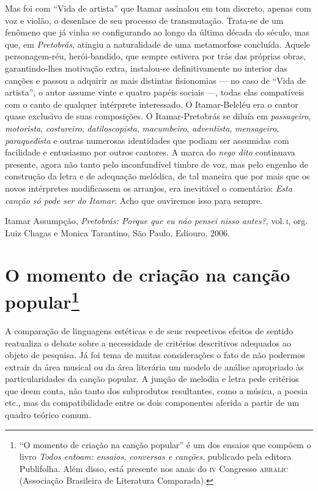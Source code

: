 Mas foi com ``Vida de artista'' que Itamar assinalou em tom discreto, apenas
com voz e violão, o desenlace de seu processo de transmutação. Trata-se
de um fenômeno que já vinha se configurando ao longo da última década do
século, mas que, em \textit{Pretobrás}, atingiu a naturalidade de uma metamorfose
concluída. Aquele personagem-réu, herói-bandido, que sempre estivera por
trás das próprias obras, garantindo-lhes motivação extra, instalou-se
definitivamente no interior das canções e passou a adquirir as mais
distintas fisionomias --- no caso de ``Vida de artista'', o autor assume vinte e quatro
papéis sociais ---, todas elas compatíveis com o canto de qualquer
intérprete interessado. O Itamar-Beleléu era o cantor quase exclusivo
de suas composições. O Itamar-Pretobrás se diluía em \textit{passageiro},
\textit{motorista}, \textit{costureiro}, \textit{datiloscopista}, \textit{macumbeiro},
\textit{adventista}, \textit{mensageiro}, \textit{paraquedista} e outras numerosas
identidades que podiam ser assumidas com facilidade e entusiasmo por
outros cantores. A marca do \textit{nego dito} continuava presente, agora não
tanto pelo inconfundível timbre de voz, mas pelo engenho de construção
da letra e de adequação melódica, de tal maneira que por mais que os
novos intérpretes modificassem os arranjos, era inevitável o comentário:
\textit{Esta canção só pode ser do Itamar}. Acho que ouviremos isso para
sempre.

Itamar Assumpção, \textit{Pretobrás: Porque que eu não pensei nisso antes?}, vol.\,\textsc{i}, org. Luiz Chagas e Monica Tarantino, São Paulo, Ediouro, 2006.

\chapter{O momento de criação na canção popular\footnote{``O momento de criação na canção popular'' é um dos ensaios que compõem o livro \textit{Todos entoam: ensaios, conversas e canções}, publicado pela editora Publifolha. 
Além disso, está presente nos anais do \textsc{iv} Congresso \textsc{abralic} (Associação Brasileira de Literatura Comparada).}}



A comparação de linguagens estéticas e de seus respectivos efeitos de
sentido reatualiza o debate sobre a necessidade de critérios descritivos
adequados ao objeto de pesquisa. Já foi tema de muitas considerações o
fato de não podermos extrair da área musical ou da área literária um
modelo de análise apropriado às particularidades da canção popular. A
junção de melodia e letra pede critérios que deem conta, não tanto dos
subprodutos resultantes, como a música, a poesia etc., mas da
compatibilidade entre os dois componentes aferida a partir de um quadro
teórico comum.

